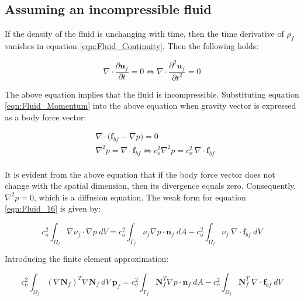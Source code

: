 \documentclass[3p]{elsarticle}
\begin{document}
\subsection{Assuming an incompressible fluid}
\vspace{0.2in}
\noindent If the density of the fluid is unchanging with time, then the time derivative of $\rho_f$ vanishes in equation \eqref{eqn:Fluid_Continuity}. Then the following holds:

\begin{equation}
    \label{eqn:Fluid_15}
    \nabla \cdot \frac{\partial \mathbf{u}_f}{\partial t} = 0 \iff \nabla \cdot \frac{\partial^2 \mathbf{u}_f}{\partial t^2} = 0
\end{equation}

\noindent The above equation implies that the fluid is incompressible. Substituting equation \eqref{eqn:Fluid_Momentum} into the above equation when gravity vector is expressed as a body force vector:

\begin{equation}
    \label{eqn:Fluid_16}
    \begin{aligned}
    &\nabla \cdot \Big(\mathbf{f}_{bf}-\nabla p\Big) = 0\\
    & \nabla^2p = \nabla \cdot \mathbf{f}_{bf} \iff c_o^2 \nabla^2p = c_o^2~\nabla \cdot \mathbf{f}_{bf}\\
    \end{aligned} 
\end{equation}

\noindent It is evident from the above equation that if the body force vector does not change with the spatial dimension, then its divergence equals zero. Consequently, $\nabla^2p = 0$, which is a diffusion equation. The weak form for equation \eqref{eqn:Fluid_16} is given by:

\begin{equation}
    \label{eqn:Fluid_17}
    c_o^2 \int_{\Omega_f} \nabla \nu_f \cdot \nabla p~dV = c_o^2 \int_{\Gamma_f} \nu_f \nabla p \cdot \mathbf{n}_f~dA - c_o^2 \int_{\Omega_f} \nu_f~\nabla \cdot \mathbf{f}_{bf}~dV
\end{equation}

\noindent Introducing the finite element approximation:

\begin{equation}
    \label{eqn:Fluid_18}
     c_o^2 \int_{\Omega_f} (\nabla \mathbf{N}_f)^T \nabla \mathbf{N}_f~dV~\mathbf{{p}}_f = c_o^2 \int_{\Gamma_f} \mathbf{N}_f^T \nabla p \cdot \mathbf{n}_f~dA - c_o^2 \int_{\Omega_f} \mathbf{N}_f^T~\nabla \cdot \mathbf{f}_{bf}~dV
\end{equation}
\end{document}
